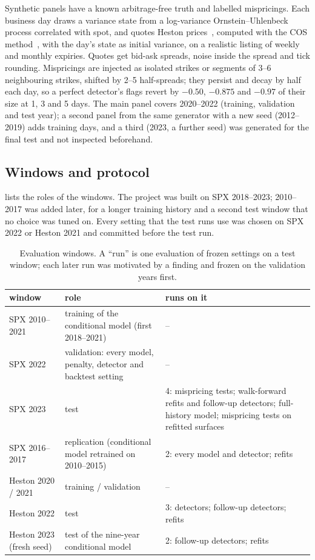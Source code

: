 Synthetic panels have a known arbitrage-free truth and labelled mispricings. Each business day
draws a variance state from a log-variance Ornstein--Uhlenbeck process correlated with spot, and
quotes Heston prices~\citep{heston1993}, computed with the COS method~\citep{fang2008}, with the
day's state as initial variance, on a realistic listing of weekly and monthly expiries. Quotes get
bid-ask spreads, noise inside the spread and tick rounding. Mispricings are injected as isolated
strikes or segments of 3--6 neighbouring strikes, shifted by 2--5 half-spreads; they persist and
decay by half each day, so a perfect detector's flags revert by $-0.50$, $-0.875$ and $-0.97$ of
their size at 1, 3 and 5 days. The main panel covers 2020--2022 (training, validation and test
year); a second panel from the same generator with a new seed (2012--2019) adds training days, and
a third (2023, a further seed) was generated for the final test and not inspected beforehand.

\subsection{Windows and protocol}

 lists the roles of the windows. The project was built on SPX 2018--2023;
2010--2017 was added later, for a longer training history and a second test window that no choice
was tuned on. Every setting that the test runs use was chosen on SPX 2022 or Heston 2021 and
committed before the test run.

\begin{table}[t]
  \centering\small
  \caption{Evaluation windows. A ``run'' is one evaluation of frozen settings on a test window; each
  later run was motivated by a finding and frozen on the validation years first.}
  \label{tab:windows}
  \begin{tabular}{@{}lp{5.6cm}p{6.6cm}@{}}
    \toprule
    window & role & runs on it \\
    \midrule
    SPX 2010--2021 & training of the conditional model (first 2018--2021) & -- \\
    SPX 2022 & validation: every model, penalty, detector and backtest setting & -- \\
    SPX 2023 & test & 4: mispricing tests; walk-forward refits and follow-up detectors; full-history model; mispricing tests on refitted surfaces \\
    SPX 2016--2017 & replication (conditional model retrained on 2010--2015) & 2: every model and detector; refits \\
    Heston 2020 / 2021 & training / validation & -- \\
    Heston 2022 & test & 3: detectors; follow-up detectors; refits \\
    Heston 2023 (fresh seed) & test of the nine-year conditional model & 2: follow-up detectors; refits \\
    \bottomrule
  \end{tabular}
\end{table}

